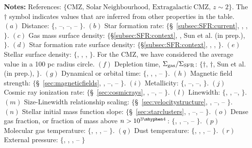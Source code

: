\begin{table*}[ht]
    \begin{minipage}{\textwidth}\small
    \vspace{1mm} {\bf Notes:} References: $\{\mathrm{CMZ,\,Solar\ Neighbourhood,\,Extragalactic\ CMZ,\,}z\sim2\}$. The $\dagger$ symbol indicates values that are inferred from other properties in the table.
    $(a)$ Distance: $\{$\citet{GravityCollaboration2019}, --, --, -- $\}$.
    $(b)$ Star formation rate: $\{$\S~\ref{subsec:SFR:current}, \citet{Spilker2021}, \citet{Pessa2021}, \citet{Leslie2020}$\}$.
    $(c)$ Gas mass surface density: $\{$\S\ref{subsec:SFR:context}, \citet{Spilker2021}, Sun et al. (in prep.), \citet{Bolatto2015} $\}$.
    $(d)$ Star formation rate surface density: $\{$\S\ref{subsec:SFR:context}, \citet{Spilker2021}, \citet{Pessa2021}, \citet{Freundlich2013} $\}$.
    $(e)$ Stellar surface density: $\{$\citet{Sormani2021}, \citet{McKee2015}, \citet{Querejeta2015}, \citet{vanDokkum2010}$\}$. For the CMZ, we have considered the average value in a 100 pc radius circle.
    $(f)$ Depletion time, $\Sigma_{\rm gas}/\Sigma_{\rm SFR}$: $\{$$\dagger$, $\dagger$, Sun et al. (in prep.), \citet{Tacconi2020}$\}$.
    $(g)$ Dynamical or orbital time: $\{$\citet{Kruijssen2015}, \cite{Bland-Hawthorn2016}, \cite{Comeron2010}, -- $\}$.
    $(h)$ Magnetic field strength: $\{$\S~\ref{sec:magneticfields}, \citet{Chapman2011}, --, -- $\}$.
    $(i)$ Metallicity: $\{$\citet{Balser2011}, --, --, \citet{Maiolino2008} $\}$.
    $(j)$ Cosmic ray ionization rate: $\{$\S~\ref{sec:cosmicrays}, \citet{Neufeld2017}, --, -- $\}$.
    $(l)$ Linewidth: $\{$\citet{Shetty2012}, \citet{Heyer2015}, --, \citet{Swinbank2015} $\}$.
    $(m)$ Size-Linewidth relationship scaling: $\{$\S~\ref{sec:velocitystructure}, \citet{Heyer2015}, --, -- $\}$.
    $(n)$ Stellar initial mass function slope: $\{$\S~\ref{sec:starclusters}, \citet{Offner2014}, --, -- $\}$.
    $(o)$ Dense gas fraction, or fraction of mass above $n>10^{3\mhyphen4}$\,\cmc: $\{$\citet{Longmore2013b}, \citet{Spilker2021}, --, -- $\}$.
    $(p)$ Molecular gas temperature: $\{$\citet{Krieger2017}, \citet{Friesen2017}, \citet{Mangum2013}, -- $\}$.
    $(q)$ Dust temperature: $\{$\citet{Tang2021a}, \citet{Chen2016}, \citet{Mangum2013}, -- $\}$.
    $(r)$ External pressure: $\{$\citet{Myers2022}, \citet{Field2011}, \citet{Sun2020b}, -- $\}$
    \end{minipage}
    
\end{table*}